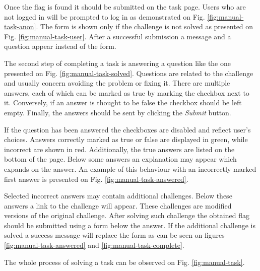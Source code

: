 Once the flag is found it should be submitted on the task page. Users who are not logged in will be prompted to log in as demonstrated on Fig. \ref{fig:manual-task-anon}. The form is shown only if the challenge is not solved as presented on Fig. \ref{fig:manual-task-user}. After a successful submission a message and a question appear instead of the form.

The second step of completing a task is answering a question like the one presented on Fig. \ref{fig:manual-task-solved}. Questions are related to the challenge and usually concern avoiding the problem or fixing it. There are multiple answers, each of which can be marked as true by marking the checkbox next to it. Conversely, if an answer is thought to be false the checkbox should be left empty. Finally, the answers should be sent by clicking the \textit{Submit} button.

If the question has been answered the checkboxes are disabled and reflect user's choices. Answers correctly marked as true or false are displayed in green, while incorrect are shown in red. Additionally, the true answers are listed on the bottom of the page. Below some answers an explanation may appear which expands on the answer. An example of this behaviour with an incorrectly marked first answer is presented on Fig. \ref{fig:manual-task-answered}.

Selected incorrect answers may contain additional challenges. Below these answers a link to the challenge will appear. These challenges are modified versions of the original challenge. After solving such challenge the obtained flag should be submitted using a form below the answer. If the additional challenge is solved a success message will replace the form as can be seen on figures \ref{fig:manual-task-answered} and \ref{fig:manual-task-complete}.

The whole process of solving a task can be observed on Fig. \ref{fig:manual-task}.

